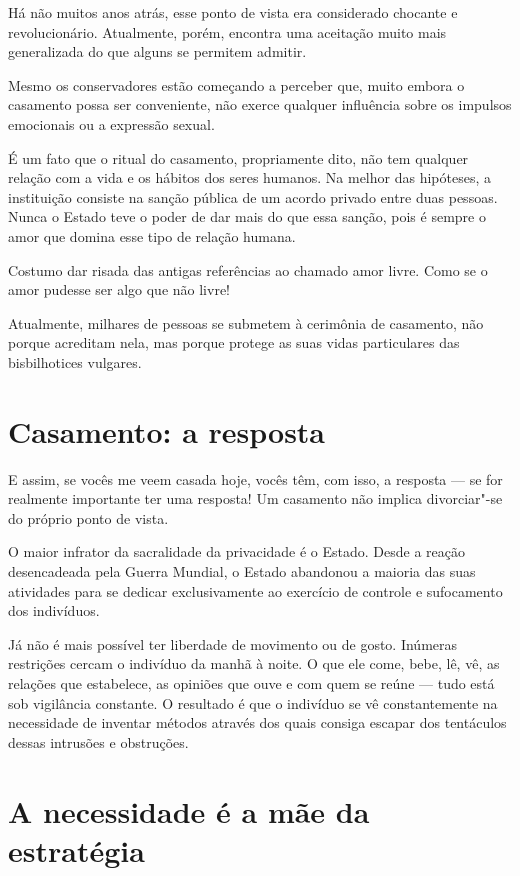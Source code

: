 Há não muitos anos atrás, esse ponto de vista era considerado chocante e
revolucionário. Atualmente, porém, encontra uma aceitação muito mais
generalizada do que alguns se permitem admitir.

Mesmo os conservadores estão começando a perceber que, muito embora o
casamento possa ser conveniente, não exerce qualquer influência sobre os
impulsos emocionais ou a expressão sexual.

É um fato que o ritual do casamento, propriamente dito, não tem qualquer
relação com a vida e os hábitos dos seres humanos. Na melhor das
hipóteses, a instituição consiste na sanção pública de um acordo privado
entre duas pessoas. Nunca o Estado teve o poder de dar mais do que essa
sanção, pois é sempre o amor que domina esse tipo de relação humana.

Costumo dar risada das antigas referências ao chamado amor livre. Como
se o amor pudesse ser algo que não livre!

Atualmente, milhares de pessoas se submetem à cerimônia de casamento,
não porque acreditam nela, mas porque protege as suas vidas particulares
das bisbilhotices vulgares.

\section{Casamento: a resposta}

E assim, se vocês me veem casada hoje, vocês têm, com isso, a resposta --- se
for realmente importante ter uma resposta! Um casamento não implica
divorciar"-se do próprio ponto de vista.

O maior infrator da sacralidade da privacidade é o Estado. Desde a
reação desencadeada pela Guerra Mundial, o Estado abandonou a maioria
das suas atividades para se dedicar exclusivamente ao exercício de
controle e sufocamento dos indivíduos.

Já não é mais possível ter liberdade de movimento ou de gosto. Inúmeras
restrições cercam o indivíduo da manhã à noite. O que ele come, bebe,
lê, vê, as relações que estabelece, as opiniões que ouve e com quem
se reúne --- tudo está sob vigilância constante. O resultado é que o
indivíduo se vê constantemente na necessidade de inventar métodos
através dos quais consiga escapar dos tentáculos dessas intrusões e
obstruções.

\section{A necessidade é a mãe da estratégia}

